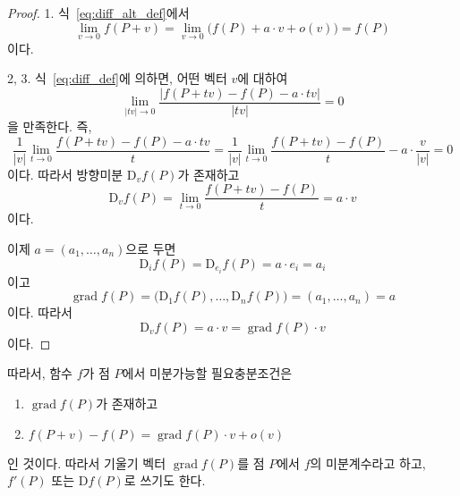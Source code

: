 \documentclass[unfonts,oneside,a4paper]{oblivoir}
\theoremstyle{definition}
\theoremstyle{theorem}
\renewcommand{\vec}[1]{\bm{\mathit{#1}}}
\newcommand{\vecz}{\bm{\mathrm{0}}}
\newcommand{\dD}{\mathrm{D}}
\DeclareMathOperator{\grad}{grad}
\begin{document}
\begin{proof}
    1. 식~\ref{eq:diff_alt_def}에서
    \begin{equation*}
        \lim_{\vec v \rightarrow \vecz} f(P + \vec v) = \lim_{\vec v \rightarrow \vecz} \bigl(f(P) + \vec a \cdot \vec v + o(\vec v)\bigr) = f(P)
    \end{equation*}
    이다.

    2, 3. 식~\ref{eq:diff_def}에 의하면, 어떤 벡터 $\vec v$에 대하여
    \begin{equation*}
        \lim_{|t \vec v| \rightarrow 0} \frac{|f(P + t \vec v) - f(P) - \vec a \cdot t \vec v|}{|t \vec v|} = 0
    \end{equation*}
    을 만족한다.
    즉,
    \begin{equation*}
        \frac{1}{|\vec v|} \lim_{t \rightarrow 0} \frac{f(P + t \vec v) - f(P) - \vec a \cdot t \vec v}{t} = \frac{1}{|\vec v|} \lim_{t \rightarrow 0} \frac{f(P + t \vec v) - f(P)}{t} - \vec a \cdot \frac{\vec v}{|\vec v|} = 0
    \end{equation*}
    이다.
    따라서 방향미분 $\dD_{\vec v} f(P)$가 존재하고
    \begin{equation*}
        \dD_{\vec v} f(P) = \lim_{t \rightarrow 0} \frac{f(P + t \vec v) - f(P)}{t} = \vec a \cdot \vec v
    \end{equation*}
    이다.

    이제 $\vec a = (a_1, \dots, a_n)$으로 두면
    \begin{equation*}
        \dD_i f(P) = \dD_{\vec e_i} f(P) = \vec a \cdot \vec e_i = a_i
    \end{equation*}
    이고
    \begin{equation*}
        \grad f(P) = \bigl(\dD_1 f(P), \dots, \dD_n f(P)\bigr) = (a_1, \dots, a_n) = \vec a
    \end{equation*}
    이다.
    따라서
    \begin{equation*}
        \dD_{\vec v} f(P) = \vec a \cdot \vec v = \grad f(P) \cdot \vec v
    \end{equation*}
    이다.
\end{proof}

따라서, 함수 $f$가 점 $P$에서 미분가능할 필요충분조건은
\begin{enumerate}
    \item $\grad f(P)$가 존재하고
    \item $f(P + \vec v) - f(P) = \grad f(P) \cdot \vec v + o(\vec v)$
\end{enumerate}
인 것이다.
따라서 기울기 벡터 $\grad f(P)$를 점 $P$에서 $f$의 미분계수라고 하고, $f'(P)$ 또는 $\dD f(P)$로 쓰기도 한다.
\end{document}
